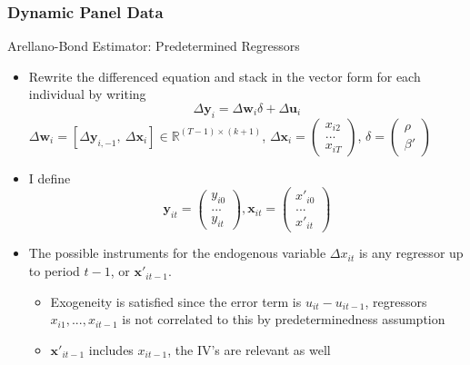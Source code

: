 \documentclass{beamer}
\begin{document}
\begin{frame}
\frametitle{Dynamic Panel Data}
Arellano-Bond Estimator: Predetermined Regressors
\begin{itemize}
\item Rewrite the differenced equation and stack in the vector form for each individual by writing
\[
\Delta \mathbf{y}_i=\Delta \mathbf{w}_i\delta + \Delta \mathbf{u}_i
\]
$\Delta \mathbf{w}_i=[\Delta \mathbf{y}_{i,-1},\ \Delta \mathbf{x}_i ]\in\mathbb{R}^{(T-1)\times (k+1)}$, $\Delta \mathbf{x}_i=\begin{pmatrix} x_{i2} \\ ... \\x_{iT}\end{pmatrix}$, $\delta=\begin{pmatrix}\rho \\ \beta'\end{pmatrix}$
\item I define
\[
\mathbf{y}_{it}=\begin{pmatrix}y_{i0}\\ ... \\ y_{it} \end{pmatrix},\mathbf{x}_{it}=\begin{pmatrix}x'_{i0}\\ ... \\ x'_{it} \end{pmatrix}
\]
\item The possible instruments for the endogenous variable $\Delta x_{it}$ is any regressor up to period $t-1$, or $\mathbf{x}'_{it-1}$.
\begin{itemize}
\item Exogeneity is satisfied since the error term is $u_{it}-u_{it-1}$, regressors $x_{i1},...,x_{it-1}$ is not correlated to this by predeterminedness assumption
\item  $\mathbf{x}'_{it-1}$ includes $x_{it-1}$, the IV's are relevant as well
\end{itemize}
\end{itemize}
\end{frame}
\end{document}
